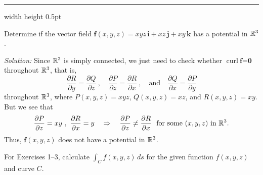 \vspace{3mm}
\hrule width \textwidth height 0.5pt
\begin{exmp}
 Determine if the vector field $\textbf{f}(x,y,z) = xyz\,\textbf{i} + xz\,\textbf{j} + xy\,\textbf{k}$ has a
 potential in $\mathbb{R}^{3}$.\vspace{1mm}
 \par\noindent\emph{Solution:} Since $\mathbb{R}^{3}$ is simply connected, we just need to check whether $\text{curl}~
 \textbf{f} = \textbf{0}$ throughout $\mathbb{R}^{3}$, that is,
 \begin{displaymath}
  \frac{\partial R}{\partial y} = \frac{\partial Q}{\partial z}~,\quad
  \frac{\partial P}{\partial z} = \frac{\partial R}{\partial x}~,\quad\text{and}\quad
  \frac{\partial Q}{\partial x} = \frac{\partial P}{\partial y}
 \end{displaymath}
 throughout $\mathbb{R}^{3}$, where $P(x,y,z)=xyz$, $Q(x,y,z)=xz$, and $R(x,y,z)=xy$. But we see that
 \begin{displaymath}
  \frac{\partial P}{\partial z} = xy ~,~ \frac{\partial R}{\partial x} = y \quad\Rightarrow\quad
  \frac{\partial P}{\partial z} \ne \frac{\partial R}{\partial x} ~~\text{for some $(x,y,z)$ in $\mathbb{R}^{3}$.}
 \end{displaymath}
 Thus, $\textbf{f}(x,y,z)$ does not have a potential in $\mathbb{R}^{3}$.
\end{exmp}
\startexercises\label{sec4dot5}
\par\noindent For Exercises 1--3, calculate $\int_C f(x,y,z)\,ds$ for the given function $f(x,y,z)$ and
curve $C$.
